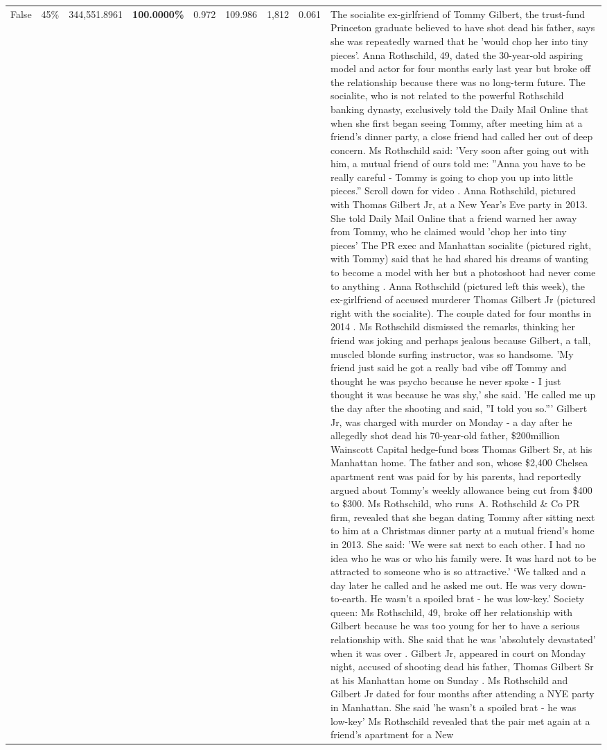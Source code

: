\begin{table}[H]
\begin{tabular}{lllrlllll}
False & 45\% & 344,551.8961 & \bfseries \color{red} 100.0000\% & 0.972 & 109.986 & 1,812 & 0.061 & The socialite ex-girlfriend of Tommy Gilbert, the trust-fund Princeton graduate believed to have shot dead his father, says she was repeatedly warned that he 'would chop her into tiny pieces'. Anna Rothschild, 49, dated the 30-year-old aspiring model and actor for four months early last year but broke off the relationship because there was no long-term future. The socialite, who is not related to the powerful Rothschild banking dynasty, exclusively told the Daily Mail Online that when she first began seeing Tommy, after meeting him at a friend's dinner party, a close friend had called her out of deep concern. Ms Rothschild said: 'Very soon after going out with him, a mutual friend of ours told me: ''Anna you have to be really careful - Tommy is going to chop you up into little pieces.'' Scroll down for video . Anna Rothschild, pictured with Thomas Gilbert Jr, at a New Year's Eve party in 2013. She told Daily Mail Online that a friend warned her away from Tommy, who he claimed would 'chop her into tiny pieces' The PR exec and Manhattan socialite (pictured right, with Tommy) said that he had shared his dreams of wanting to become a model with her but a photoshoot had never come to anything . Anna Rothschild (pictured left this week), the ex-girlfriend of accused murderer Thomas Gilbert Jr (pictured right with the socialite). The couple dated for four months in 2014 . Ms Rothschild dismissed the remarks, thinking her friend was joking and perhaps jealous because Gilbert, a tall, muscled blonde surfing instructor, was so handsome. 'My friend just said he got a really bad vibe off Tommy and thought he was psycho because he never spoke - I just thought it was because he was shy,' she said. 'He called me up the day after the shooting and said, ''I told you so.''' Gilbert Jr, was charged with murder on Monday - a day after he allegedly shot dead his 70-year-old father, \$200million Wainscott Capital hedge-fund boss Thomas Gilbert Sr, at his Manhattan home. The father and son, whose \$2,400 Chelsea apartment rent was paid for by his parents, had reportedly argued about Tommy's weekly allowance being cut from \$400 to \$300. Ms Rothschild, who runs A. Rothschild \& Co PR firm, revealed that she began dating Tommy after sitting next to him at a Christmas dinner party at a mutual friend's home in 2013. She said: 'We were sat next to each other. I had no idea who he was or who his family were. It was hard not to be attracted to someone who is so attractive.' ‘We talked and a day later he called and he asked me out. He was very down-to-earth. He wasn’t a spoiled brat - he was low-key.’ Society queen: Ms Rothschild, 49, broke off her relationship with Gilbert because he was too young for her to have a serious relationship with. She said that he was 'absolutely devastated' when it was over . Gilbert Jr, appeared in court on Monday night, accused of shooting dead his father, Thomas Gilbert Sr at his Manhattan home on Sunday . Ms Rothschild and Gilbert Jr dated for four months after attending a NYE party in Manhattan. She said 'he wasn't a spoiled brat - he was low-key' Ms Rothschild revealed that the pair met again at a friend’s apartment for a New 
\end{tabular}
\end{table}
